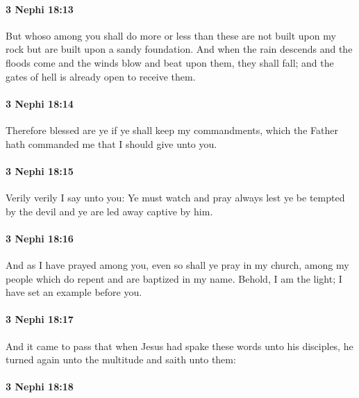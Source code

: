 		\paragraph{3 Nephi 18:13} %
			\label{3NEPHI-18-13}

			But whoso among you shall do more or less than these
			are not built upon my rock but are built upon a sandy foundation.
			And when the rain descends and the floods come
			and the winds blow and beat upon them,
			they shall fall;
			and the gates of hell is already open to receive them.

		\paragraph{3 Nephi 18:14} %
			\label{3NEPHI-18-14}

			Therefore blessed are ye if ye shall keep my commandments,
			which the Father hath commanded me that I should give unto you.

		\paragraph{3 Nephi 18:15} %
			\label{3NEPHI-18-15}

			Verily verily I say unto you:
			Ye must watch and pray always lest ye be tempted by the devil
			and ye are led away captive by him.

		\paragraph{3 Nephi 18:16} %
			\label{3NEPHI-18-16}

			And as I have prayed among you,
			even so shall ye pray in my church,
			among my people which do repent and are baptized in my name.
			Behold, I am the light;
			I have set an example before you.

		\paragraph{3 Nephi 18:17} %
			\label{3NEPHI-18-17}

			And it came to pass that when Jesus had spake these words unto his disciples,
			he turned again unto the multitude and saith unto them:

		\paragraph{3 Nephi 18:18} %
			\label{3NEPHI-18-18}


